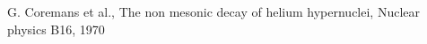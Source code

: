 \documentclass[preview]{standalone}
\begin{document}
\begin{center}
G. Coremans et al., The non mesonic decay of helium hypernuclei, Nuclear physics B16, 1970
\end{center}
\end{document}
